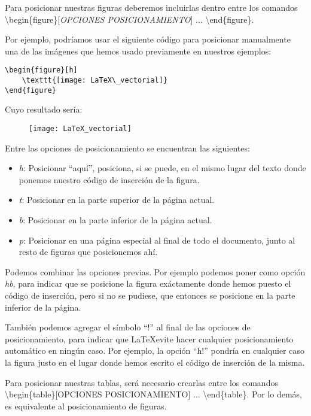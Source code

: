 Para posicionar nuestras figuras deberemos incluirlas dentro entre los comandos \textbackslash begin\{figure\}[\emph{OPCIONES POSICIONAMIENTO}] ... \textbackslash end\{figure\}.

Por ejemplo, podríamos usar el siguiente código para posicionar manualmente una de las imágenes que hemos usado previamente en nuestros ejemplos:

\begin{lstlisting}
\begin{figure}[h]
	\texttt{[image: LaTeX\_vectorial]}	
\end{figure}
\end{lstlisting}

Cuyo resultado sería:

\begin{figure}[h]
	\texttt{[image: LaTeX\_vectorial]}	
\end{figure}

Entre las opciones de posicionamiento se encuentran las siguientes:

\begin{itemize}
	\item \emph{h}: Posicionar ``aquí'', posiciona, si se puede, en el mismo lugar del texto donde ponemos nuestro código de inserción de la figura.
	\item \emph{t}: Posicionar en la parte superior de la página actual.
	\item \emph{b}: Posicionar en la parte inferior de la página actual.
	\item \emph{p}: Posicionar en una página especial al final de todo el documento, junto al resto de figuras que posicionemos ahí.
\end{itemize}

Podemos combinar las opciones previas. Por ejemplo podemos poner como opción \emph{hb}, para indicar que se posicione la figura exáctamente donde hemos puesto el código de inserción, pero si no se pudiese, que entonces se posicione en la parte inferior de la página.

También podemos agregar el símbolo ``!'' al final de las opciones de posicionamiento, para indicar que \LaTeX evite hacer cualquier posicionamiento automático en ningún caso. Por ejemplo, la opción ``h!'' pondría en cualquier caso la figura justo en el lugar donde hemos escrito el código de inserción de la misma.

Para posicionar nuestras tablas, será necesario crearlas entre los comandos \textbackslash begin\{table\}[OPCIONES POSICIONAMIENTO] ... \textbackslash end\{table\}. Por lo demás, es equivalente al posicionamiento de figuras.

